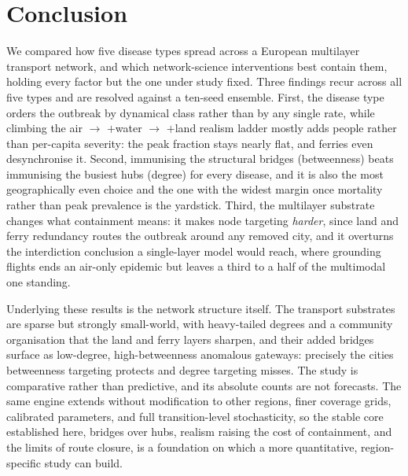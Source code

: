 \section{Conclusion}
We compared how five disease types spread across a European multilayer transport network, and which
network-science interventions best contain them, holding every factor but the one under study fixed.
Three findings recur across all five types and are resolved against a ten-seed ensemble. First, the
disease type orders the outbreak by dynamical class rather than by any single rate, while climbing
the air $\rightarrow$ $+$water $\rightarrow$ $+$land realism ladder mostly adds people rather than
per-capita severity: the peak fraction stays nearly flat, and ferries even desynchronise it. Second,
immunising the structural bridges (betweenness) beats immunising the busiest hubs (degree) for every
disease, and it is also the most geographically even choice and the one with the widest margin once
mortality rather than peak prevalence is the yardstick. Third, the multilayer substrate changes what
containment means: it makes node targeting \emph{harder}, since land and ferry redundancy routes the
outbreak around any removed city, and it overturns the interdiction conclusion a single-layer model
would reach, where grounding flights ends an air-only epidemic but leaves a third to a half of the
multimodal one standing.

Underlying these results is the network structure itself. The transport substrates are sparse but
strongly small-world, with heavy-tailed degrees and a community organisation that the land and ferry
layers sharpen, and their added bridges surface as low-degree, high-betweenness anomalous gateways:
precisely the cities betweenness targeting protects and degree targeting misses. The study is
comparative rather than predictive, and its absolute counts are not forecasts. The same engine
extends without modification to other regions, finer coverage grids, calibrated parameters, and full
transition-level stochasticity, so the stable core established here, bridges over hubs, realism
raising the cost of containment, and the limits of route closure, is a foundation on which a more
quantitative, region-specific study can build.
